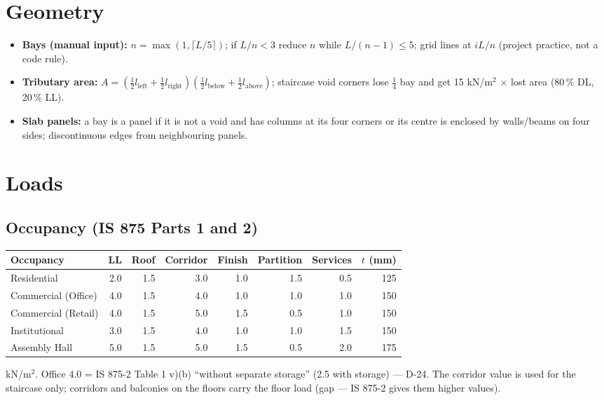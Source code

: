 \documentclass[10pt,a4paper]{article}
\begin{document}
\section{Geometry}
\begin{itemize}
\item \textbf{Bays (manual input):} $n=\max(1,\lceil L/5\rceil)$; if $L/n<3$ reduce $n$ while $L/(n-1)\le 5$; grid
lines at $iL/n$ (project practice, not a code rule).
\item \textbf{Tributary area:} $A=(\tfrac12 l_\text{left}+\tfrac12 l_\text{right})(\tfrac12 l_\text{below}+\tfrac12
l_\text{above})$; staircase void corners lose $\tfrac14$ bay and get 15 kN/m$^2$ $\times$ lost area (80\,\% DL,
20\,\% LL).
\item \textbf{Slab panels:} a bay is a panel if it is not a void and has columns at its four corners or its centre is
enclosed by walls/beams on four sides; discontinuous edges from neighbouring panels.
\end{itemize}

\section{Loads}
\subsection{Occupancy (IS 875 Parts 1 and 2)}\label{tab:loads}
\begin{longtable}{L{36mm}rrrrrrr}
\toprule \textbf{Occupancy} & \textbf{LL} & \textbf{Roof} & \textbf{Corridor} & \textbf{Finish} & \textbf{Partition}
& \textbf{Services} & $t$ (mm) \\ \midrule \endhead
Residential & 2.0 & 1.5 & 3.0 & 1.0 & 1.5 & 0.5 & 125 \\
Commercial (Office) & 4.0 & 1.5 & 4.0 & 1.0 & 1.0 & 1.0 & 150 \\
Commercial (Retail) & 4.0 & 1.5 & 5.0 & 1.5 & 0.5 & 1.0 & 150 \\
Institutional & 3.0 & 1.5 & 4.0 & 1.0 & 1.0 & 1.5 & 150 \\
Assembly Hall & 5.0 & 1.5 & 5.0 & 1.5 & 0.5 & 2.0 & 175 \\
\bottomrule
\end{longtable}
kN/m$^2$. Office 4.0 = IS 875-2 Table 1 v)(b) ``without separate storage'' (2.5 with storage) --- D-24.
The corridor value is used for the staircase only; corridors and balconies on the floors carry the floor load
(gap --- IS 875-2 gives them higher values).
\end{document}
